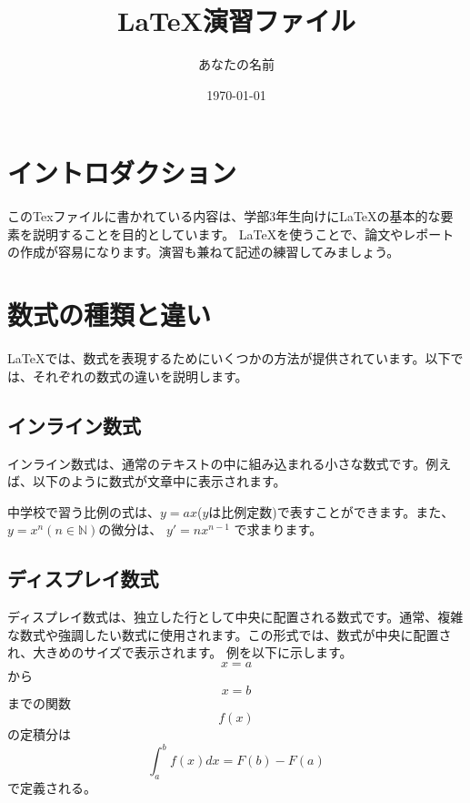 \documentclass[a4paper,12pt]{article}
\title{LaTeX演習ファイル}
\author{あなたの名前}
\date{\today}
\begin{document}
\maketitle

\tableofcontents

\newpage

\section{イントロダクション}

このTexファイルに書かれている内容は、学部3年生向けにLaTeXの基本的な要素を説明することを目的としています。
LaTeXを使うことで、論文やレポートの作成が容易になります。演習も兼ねて記述の練習してみましょう。

\section{数式の種類と違い}

LaTeXでは、数式を表現するためにいくつかの方法が提供されています。以下では、それぞれの数式の違いを説明します。

\subsection{インライン数式}

インライン数式は、通常のテキストの中に組み込まれる小さな数式です。例えば、以下のように数式が文章中に表示されます。

中学校で習う比例の式は、$y=ax$($y$は比例定数)で表すことができます。また、\(y = x^n (n \in \mathbb{N})\)の微分は、
\begin{math}
    y' = nx^{n-1}
\end{math}
で求まります。
\subsection{ディスプレイ数式}

ディスプレイ数式は、独立した行として中央に配置される数式です。通常、複雑な数式や強調したい数式に使用されます。この形式では、数式が中央に配置され、大きめのサイズで表示されます。
例を以下に示します。
$$ x = a$$ から \[x = b \]までの関数$$f(x)$$の定積分は
\begin{displaymath}
    \int_a^b f(x) dx = F(b) - F(a)
\end{displaymath}
で定義される。
\end{document}
